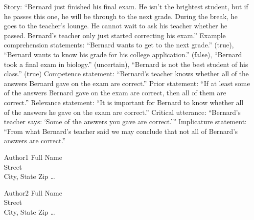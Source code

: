 \documentclass{sp}
\begin{document}
Story: “Bernard just finished his final exam. He isn't the brightest student, but if he passes this one, he will be through to the next grade. During the break, he goes to the teacher's lounge. He cannot wait to ask his teacher whether he passed. Bernard's teacher only just started correcting his exam.”
Example comprehension statements: “Bernard wants to get to the next grade.” (true), “Bernard wants to know his grade for his college application.” (false), “Bernard took a final exam in biology.” (uncertain), “Bernard is not the best student of his class.” (true)
Competence statement: “Bernard’s teacher knows whether all of the answers Bernard gave on the exam are correct.”
Prior statement: “If at least some of the answers Bernard gave on the exam are correct, then all of them are correct.”
Relevance statement: “It is important for Bernard to know whether all of the answers he gave on the exam are correct.”
Critical utterance: “Bernard’s teacher says: ‘Some of the answers you gave are correct.’”
Implicature statement: “From what Bernard’s teacher said we may conclude that not all of Bernard’s answers are correct.”




\begin{addresses}
  \begin{address}
    Author1 Full Name \\
    Street \\
    City, State Zip \ldots \\
  \end{address}
  \begin{address}
    Author2 Full Name \\
    Street \\
    City, State Zip \dots \\
  \end{address}
\end{addresses}
\end{document}
